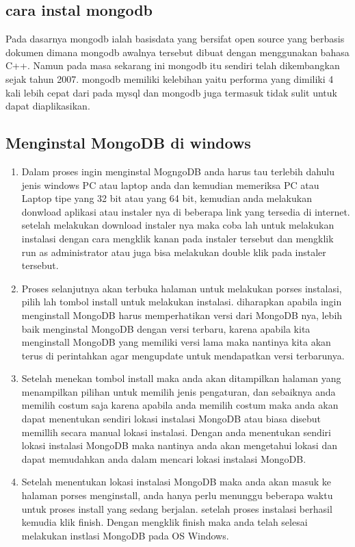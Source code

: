 \subsection{cara instal mongodb}
	Pada dasarnya mongodb ialah basisdata yang bersifat open source yang berbasis dokumen dimana mongodb awalnya tersebut dibuat dengan menggunakan bahasa C++. Namun pada masa sekarang ini mongodb itu sendiri telah dikembangkan sejak tahun 2007. mongodb memiliki kelebihan yaitu performa yang dimiliki 4 kali lebih cepat dari pada mysql dan mongodb juga termasuk tidak sulit untuk dapat diaplikasikan.
	
\subsection{Menginstal MongoDB di windows}
\begin{enumerate}
\item
	Dalam proses ingin menginstal MogngoDB anda harus tau terlebih dahulu jenis windows PC atau laptop anda dan kemudian memeriksa PC atau Laptop tipe yang 32 bit atau yang 64 bit, kemudian anda melakukan donwload aplikasi atau instaler nya di beberapa link yang tersedia di internet. setelah melakukan download instaler nya maka coba lah untuk melakukan instalasi dengan cara mengklik kanan pada instaler tersebut dan mengklik run as administrator atau juga bisa melakukan double klik pada instaler tersebut.
\item
	Proses selanjutnya akan terbuka halaman untuk melakukan porses instalasi, pilih lah tombol install untuk melakukan instalasi. diharapkan apabila ingin menginstall MongoDB harus memperhatikan versi dari MongoDB nya, lebih baik menginstal MongoDB dengan versi terbaru, karena apabila kita menginstall MongoDB yang memiliki versi lama maka nantinya kita akan terus di perintahkan agar mengupdate untuk mendapatkan versi terbarunya.
\item
	Setelah menekan tombol install maka anda akan ditampilkan halaman yang menampilkan pilihan untuk memilih jenis pengaturan, dan sebaiknya anda memilih costum saja karena apabila anda memilih costum maka anda akan dapat menentukan sendiri lokasi instalasi MongoDB atau biasa disebut memillih secara manual lokasi instalasi. Dengan anda menentukan sendiri lokasi instalasi MongoDB maka nantinya anda akan mengetahui lokasi dan dapat memudahkan anda dalam mencari lokasi instalasi MongoDB.
\item
	Setelah menentukan lokasi instalasi MongoDB maka anda akan masuk ke halaman porses menginstall, anda hanya perlu menunggu beberapa waktu untuk proses install yang sedang berjalan. setelah proses instalasi berhasil kemudia klik finish. Dengan mengklik finish maka anda telah selesai melakukan instlasi MongoDB pada OS Windows.
\end{enumerate}


